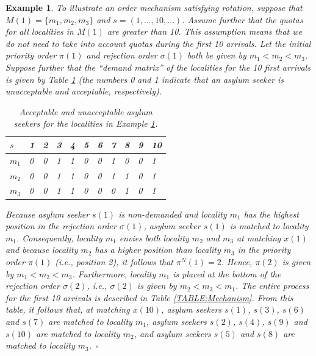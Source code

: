 \documentclass[12pt,fleqn]{article}
\newtheorem{example}{Example}
\begin{document}
\begin{example}\rm\label{EX:Mechanism}
To illustrate an order mechanism satisfying rotation, suppose that $M(1)=\{m_1,m_2,m_3\}$ and $s=(1,\ldots,10,\ldots)$. Assume further that the quotas for all localities in $M(1)$ are greater than 10. This assumption means that we do not need to take into account quotas during the first 10 arrivals. Let the initial priority order $\pi(1)$ and rejection order $\sigma(1)$ both be given by $m_1<m_2<m_3$. Suppose further that the ``demand matrix'' of the localities for the 10 first arrivals is given by Table \ref{TABLE:Demand} (the numbers 0 and 1 indicate that an asylum seeker is unacceptable and acceptable, respectively).

\begin{table}[h!]
\caption{Acceptable and unacceptable asylum seekers for the localities in Example \ref{TABLE:Demand}.}\label{TABLE:Demand}
\begin{tabular}{lllllllllll}\hline
$s$   & 1 & 2 & 3 & 4 & 5 & 6 & 7 & 8 & 9 & 10 \\ \hline
$m_1$ & 0 & 0 & 1 & 1 & 0 & 0 & 1 & 0 & 0 & 1\\
$m_2$ & 0 & 0 & 1 & 1 & 0 & 0 & 1 & 1 & 0 & 1\\
$m_3$ & 0 & 0 & 1 & 1 & 0 & 0 & 0 & 1 & 0 & 1\\ \hline
\end{tabular}
\end{table}

\noindent Because asylum seeker $s(1)$ is non-demanded and locality $m_1$ has the highest position in the rejection order $\sigma(1)$, asylum seeker $s(1)$ is matched to locality $m_1$. Consequently, locality $m_1$ envies both locality $m_2$ and $m_3$ at matching $x(1)$ and because locality $m_2$ has a higher position than locality $m_3$ in the priority order $\pi(1)$ (i.e., position 2), it follows that $\pi^N(1)=2$. Hence, $\pi(2)$ is given by $m_1<m_2<m_3$. Furthermore, locality $m_1$ is placed at the bottom of the rejection order $\sigma(2)$, i.e., $\sigma(2)$ is given by $m_2<m_3<m_1$. The entire process for the first 10 arrivals is described in Table \ref{TABLE:Mechanism}. From this table, it follows that, at matching $x(10)$, asylum seekers $s(1)$, $s(3)$, $s(6)$ and $s(7)$ are matched to locality $m_1$, asylum seekers $s(2)$, $s(4)$, $s(9)$ and $s(10)$ are matched to locality $m_2$, and asylum seekers $s(5)$ and $s(8)$ are matched to locality $m_3$.~\hfill$\square$
\end{example}
\end{document}
